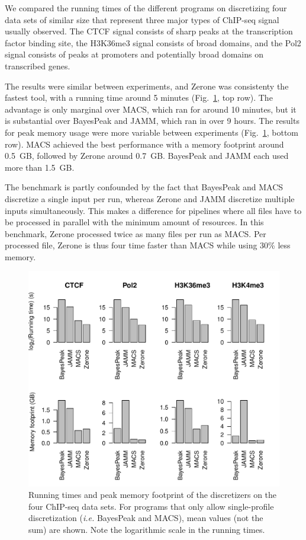 \documentclass{bioinfo}
\begin{document}
We compared the running times of the different programs on discretizing
four data sets of similar size that represent three major types of
ChIP-seq signal usually observed. The CTCF signal consists of sharp
peaks at the transcription factor binding site, the H3K36me3 signal
consists of broad domains, and the Pol2 signal consists of  peaks
at promoters and potentially broad domains on transcribed genes.

The results were similar between experiments, and Zerone was
consistenty the fastest tool, with a running time around 5 minutes
(Fig.~\ref{fig:perf}, top row). The advantage is only marginal over
MACS, which ran for around 10 minutes, but it is substantial over
BayesPeak and JAMM, which ran in over 9 hours. The results for peak
memory usage were more variable between experiments (Fig.~\ref{fig:perf},
bottom row). MACS achieved the best performance with a memory
footprint around 0.5~GB, followed by Zerone around 0.7~GB.
BayesPeak and JAMM each used more than 1.5~GB.

The benchmark is partly confounded by the fact that BayesPeak and MACS
discretize a single input per run, whereas Zerone and JAMM discretize
multiple inputs simultaneously. This makes a difference for pipelines
where all files have to be processed in parallel with the minimum
amount of resources. In this benchmark, Zerone processed twice as
many files per run as MACS. Per processed file, Zerone is thus
four time faster than MACS while using 30\% less memory.

\begin{figure}[!tpb]
\centerline{\includegraphics[scale=0.5]{performance.pdf}}
\caption{
  Running times and peak memory footprint of the
  discretizers on the four ChIP-seq data sets. For programs that only
  allow single-profile discretization (\textit{i.e.} BayesPeak and MACS),
  mean values (not the sum) are shown. Note the logarithmic scale in the
  running times.
}\label{fig:perf}
\end{figure}
\end{document}
